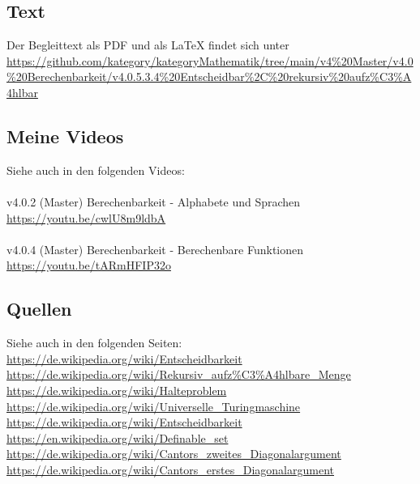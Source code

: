\documentclass[a4paper]{amsart}
\theoremstyle{definition}
\begin{document}
\subsection*{Text}
Der Begleittext als PDF und als LaTeX findet sich unter
{\tiny
   \url{https://github.com/kategory/kategoryMathematik/tree/main/v4%20Master/v4.0%20Berechenbarkeit/v4.0.5.3.4%20Entscheidbar%2C%20rekursiv%20aufz%C3%A4hlbar}
}

\subsection*{Meine Videos}
Siehe auch in den folgenden Videos:\\
\\
v4.0.2 (Master) Berechenbarkeit - Alphabete und Sprachen\\
\url{https://youtu.be/cwlU8m9ldbA}\\
\\
v4.0.4 (Master) Berechenbarkeit - Berechenbare Funktionen\\
\url{https://youtu.be/tARmHFIP32o}

\subsection*{Quellen}
Siehe auch in den folgenden Seiten:\\
\url{https://de.wikipedia.org/wiki/Entscheidbarkeit}\\
\url{https://de.wikipedia.org/wiki/Rekursiv_aufz%C3%A4hlbare_Menge}\\
\url{https://de.wikipedia.org/wiki/Halteproblem}\\
\url{https://de.wikipedia.org/wiki/Universelle_Turingmaschine}\\
\url{https://de.wikipedia.org/wiki/Entscheidbarkeit}\\
\url{https://en.wikipedia.org/wiki/Definable_set}\\
\url{https://de.wikipedia.org/wiki/Cantors_zweites_Diagonalargument}\\
\url{https://de.wikipedia.org/wiki/Cantors_erstes_Diagonalargument}\\
\url{}\\
\end{document}
